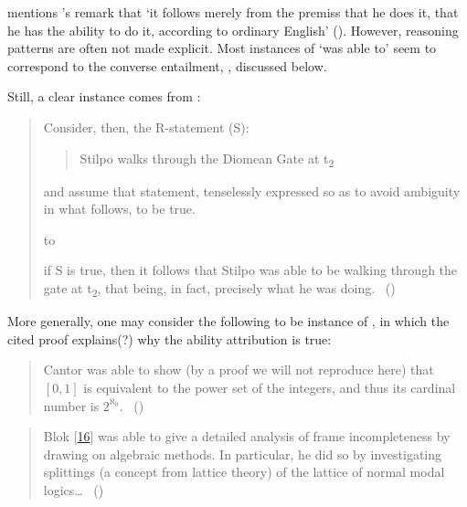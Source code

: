 \begin{note}
{    \textcite[1]{Boylan:2020aa} mentions \citeauthor{Austin:1961vz}'s  remark that `it follows merely from the premiss that he does it, that he has the ability to do it, according to ordinary English' (\citeyear[175]{Austin:1961vz}).
    However, reasoning patterns are often not made explicit.
    Most instances of `was able to' seem to correspond to the converse entailment, \BoyPSC{}, discussed below.

    Still, a clear instance comes from \textcite{Taylor:2011uh}:
    \begin{quote}
      Consider, then, the R-statement (S):

      \begin{quote}
        Stilpo walks through the Diomean Gate at t\textsubscript{2}
      \end{quote}

      and assume that statement, tenselessly expressed so as to avoid ambiguity in what follows, to be true.

      \hbox to \hsize{\hfil{\vdots}\hfil}

      if S is true, then it follows that Stilpo was able to be walking through the gate at t\textsubscript{2}, that being, in fact, precisely what he was doing.%
      \mbox{ }\hfill\mbox{(\cite[139--143]{Taylor:2011uh})}
    \end{quote}

    More generally, one may consider the following to be instance of \BoyPS{}, in which the cited proof explains(?) why the ability attribution is true:

    \begin{quote}
      Cantor was able to show (by a proof we will not reproduce here) that \([0, 1]\) is equivalent to the power set of the integers, and thus its cardinal number is \(2^{\aleph_{0}}\).\newline
      \mbox{ }\hfill\mbox{(\cite[65]{Partee:1990tu})}
    \end{quote}

    \begin{quote}
      Blok [\hyperlink{cite.Blok:1980th}{16}] was able to give a detailed analysis of frame incompleteness by drawing on algebraic methods.
      In particular, he did so by investigating splittings (a concept from lattice theory) of the lattice of normal modal logics\dots\newline
      \mbox{ }\hfill\mbox{(\cite[74]{Blackburn:2007wa})}
    \end{quote}
  }


\end{note}

